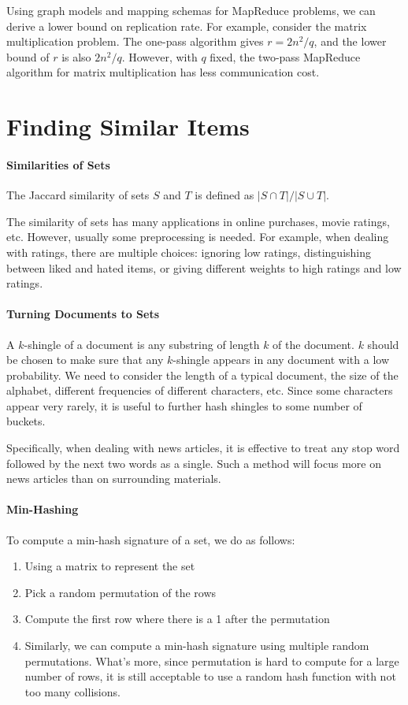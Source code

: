 \documentclass{article}
\begin{document}
Using graph models and mapping schemas for MapReduce problems, we can derive a lower bound on replication rate.
For example, consider the matrix multiplication problem. The one-pass algorithm gives $r=2n^2/q$, and the lower bound of $r$ is also $2n^2/q$. However, with $q$ fixed, the two-pass MapReduce algorithm for matrix multiplication has less communication cost.

\section*{Finding Similar Items}
\paragraph{Similarities of Sets}
The Jaccard similarity of sets $S$ and $T$ is defined as $|S\cap T|/|S\cup T|$. 

The similarity of sets has many applications in online purchases, movie ratings, etc. However, usually some preprocessing is needed. For example, when dealing with ratings, there are multiple choices: ignoring low ratings, distinguishing between liked and hated items, or giving different weights to high ratings and low ratings.

\paragraph{Turning Documents to Sets}
A $k$-shingle of a document is any substring of length $k$ of the document. $k$ should be chosen to make sure that any $k$-shingle appears in any document with a low probability. We need to consider the length of a typical document, the size of the alphabet, different frequencies of different characters, etc. Since some characters appear very rarely, it is useful to further hash shingles to some number of buckets.

Specifically, when dealing with news articles, it is effective to treat any stop word followed by the next two words as a single. Such a method will focus more on news articles than on surrounding materials.

\paragraph{Min-Hashing}
To compute a min-hash signature of a set, we do as follows:
\begin{enumerate}
\item Using a matrix to represent the set
\item Pick a random permutation of the rows
\item Compute the first row where there is a 1 after the permutation
\item Similarly, we can compute a min-hash signature using multiple random permutations. What's more, since permutation is hard to compute for a large number of rows, it is still acceptable to use a random hash function with not too many collisions.
\end{enumerate}
\end{document}
